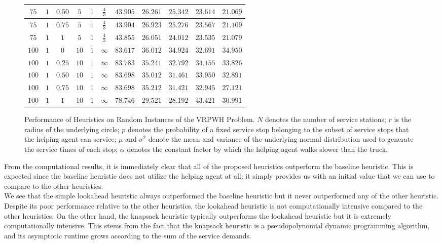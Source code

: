 \documentclass[12pt]{scrartcl}
\begin{document}
\begin{figure}[h]
\begin{longtable}{|c|c|c|c|c|c|c|c|c|c|c|}
 \hline
  $75$ & $1$ & $0.50$ & $5$ & $1$ & $\frac{4}{3}$ &  $43.905$ & $26.261$ & $25.342$ & $23.614$ & $21.069$ \\
 \hline
 $75$ & $1$ & $0.75$ & $5$ & $1$ & $\frac{4}{3}$ & $43.904$ & $26.923$ & $25.276$ & $23.567$ & $21.109$ \\
  \hline
 $75$ & $1$ & $1$ & $5$ & $1$ & $\frac{4}{3}$ & $43.855$ & $26.051$ & $24.012$ & $23.535$ & $21.079$ \\
 \hline
 $100$ & $1$ & $0$ & $10$ & $1$ & $\infty$ & $83.617$ & $36.012$ & $34.924$ & $32.691$ & $34.950$ \\
 \hline
 $100$ & $1$ & $0.25$ & $10$ & $1$ & $\infty$ & $83.783$ & $35.241$ & $32.792$ & $34.155$ & $33.826$ \\
 \hline
 $100$ & $1$ & $0.50$ & $10$ & $1$ & $\infty$ & $83.698$ & $35.012$ & $31.461$ & $33.950$ & $32.891$ \\
 \hline
 $100$ & $1$ & $0.75$ & $10$ & $1$ & $\infty$ & $83.698$ & $35.212$ & $31.421$ & $32.945$ & $27.121$ \\
 \hline
 $100$ & $1$ & $1$ & $10$  & $1$ & $\infty$ & $78.746$ & $29.521$ & $28.192$ & $43.421$ & $30.991$ \\
 \hline
 \end{longtable}  
 \caption{Performance of Heuristics on Random Instances of the VRPWH Problem. $N$ denotes the number of service stations; $r$ is the radius of the underlying circle; $p$ denotes the probability of a fixed service stop belonging to the subset of service stops that the helping agent can service; $\mu$ and $\sigma^2$ denote the mean and variance of the underlying normal distribution used to generate the service times of each stop; $\alpha$ denotes the constant factor by which the helping agent walks slower than the truck.}
\end{figure}

From the computational results, it is immediately clear that all of the proposed heuristics outperform the baseline heuristic. This is expected since the baseline heuristic does not utilize the helping agent at all; it simply provides us with an initial value that we can use to compare to the other heuristics.  \\

We see that the simple lookahead heuristic always outperformed the baseline heuristic but it never outperformed any of the other heuristic. Despite its poor performance relative to the other heuristics, the lookahead heuristic is not computationally intensive compared to the other heuristics. On the other hand, the knapsack heuristic typically outperforms the lookahead heuristic but it is extremely computationally intensive. This stems from the fact that the knapsack heuristic is a pseudopolynomial dynamic programming algorithm, and its asymptotic runtime grows according to the sum of the service demands. \\
\end{document}
